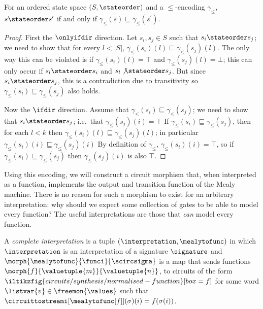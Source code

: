 \documentclass{lmcs}
\begin{document}
\begin{lem}
    For an ordered state space \((S,\stateorder)\) and a \(\leq\)-encoding
    \(\gamma_\leq\), \(s \stateorder s^\prime\) if and only if
    \(\gamma_\leq(s) \sqsubseteq \gamma_\leq(s^\prime)\).
\end{lem}
\begin{proof}
    First the \(\onlyifdir\) direction.
    Let \(s_i, s_j \in S\) such that \(s_i \stateorder s_j\); we need to show
    that for every \(l < |S|\),
    \(\gamma_\leq(s_i)(l) \sqsubseteq \gamma_\leq(s_j)(l)\).
    The only way this can be violated is if \(\gamma_\leq(s_i)(l) = \top\) and
    \(\gamma_\leq(s_j)(l) = \bot\); this can only occur if
    \(s_l \stateorder s_i\) and \(s_l \not\stateorder s_j\).
    But since \(s_i \stateorder s_j\), this is a contradiction due to
    transitivity so \(\gamma_\leq(s_l) \sqsubseteq \gamma_\leq(s_j)\) also
    holds.

    Now the \(\ifdir\) direction.
    Assume that \(\gamma_\leq(s_i) \sqsubseteq \gamma_\leq(s_j)\); we need to
    show that \(s_i \stateorder s_j\); i.e.\ that \(\gamma_\leq(s_j)(i) = \top\)
    If \(\gamma_\leq(s_i) \sqsubseteq \gamma_\leq(s_j)\), then for each
    \(l < k\) then \(\gamma_\leq(s_i)(l) \sqsubseteq \gamma_\leq(s_j)(l)\);
    in particular \(\gamma_\leq(s_i)(i) \sqsubseteq \gamma_\leq(s_j)(i)\)
    By definition of \(\gamma_\leq\), \(\gamma_\leq(s_i)(i) = \top\), so if
    \(\gamma_\leq(s_i) \sqsubseteq \gamma_\leq(s_j)\) then
    \(\gamma_\leq(s_j)(i)\) is also \(\top\).
\end{proof}

Using this encoding, we will construct a circuit morphism that,
when interpreted as a function, implements the output and transition function
of the Mealy machine.
There is no reason for such a morphism to exist for an arbitrary interpretation:
why should we expect some collection of gates to be able to model every
function?
The useful interpretations are those that \emph{can} model every function.

\begin{defi}\label{def:functional-completeness}
    A \emph{complete interpretation} is a tuple
    \((\interpretation,\mealytofunc)\) in which \(\interpretation\) is an
    interpretation of a signature \(\signature\) and \(
    \morph{\mealytofunc}{\funci}{\scircsigma}
    \) is a map that sends functions \(
    \morph{f}{\valuetuple{m}}{\valuetuple{n}}
    \), to circuits of the form \(
    \iltikzfig{circuits/synthesis/normalised-function}[box=f]
    \) for some word \(\listvar{v} \in \freemon{\values}\) such that
    \(\circuittostreami[\mealytofunc[f]](\sigma)(i) = f(\sigma(i))\).
\end{defi}
\end{document}
